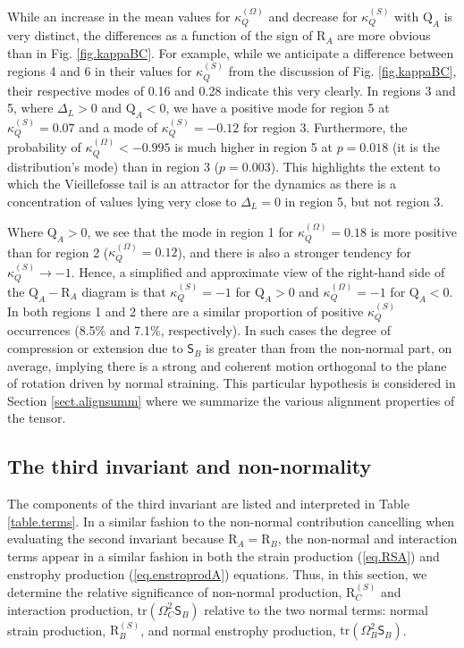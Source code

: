 \documentclass[preprint,amssymb,amsmath,aip,cha]{revtex4-1}
\begin{document}
While an increase in the mean values for $\kappa_{Q}^{(\Omega)}$ and decrease for $\kappa_{Q}^{(S)}$ with $\mbox{Q}_{A}$ is very distinct, the differences as a function of the sign of $\mbox{R}_{A}$ are more obvious than in Fig. \ref{fig.kappaBC}. For example, while we anticipate a difference between regions 4 and 6 in their values for $\kappa_{Q}^{(S)}$ from the discussion of Fig. \ref{fig.kappaBC}, their respective modes of 0.16 and 0.28 indicate this very clearly. In regions 3 and 5, where $\Delta_{L} > 0$ and $\mbox{Q}_{A} < 0$, we have a positive mode for region 5 at $\kappa_{Q}^{(S)} = 0.07$ and a mode of $\kappa_{Q}^{(S)} = -0.12$ for region 3. Furthermore, the probability of $\kappa_{Q}^{(\Omega)} < -0.995$ is much higher in region 5 at $p = 0.018$ (it is the distribution's mode) than in region 3 ($p = 0.003$). This highlights the extent to which the Vieillefosse tail is an attractor for the dynamics as there is a concentration of values lying very close to $\Delta_{L} = 0$ in region 5, but not region 3.

Where $\mbox{Q}_{A} > 0$, we see that the mode in region 1 for $\kappa_{Q}^{(\Omega)} = 0.18$ is more positive than for region 2 ($\kappa_{Q}^{(\Omega)} = 0.12$), and there is also a stronger tendency for $\kappa_{Q}^{(S)} \to -1$. Hence, a simplified and approximate view of the right-hand side of the $\mbox{Q}_{A}-\mbox{R}_{A}$ diagram is that $\kappa_{Q}^{(S)} = -1$ for $\mbox{Q}_{A} > 0$ and $\kappa_{Q}^{(\Omega)} = -1$ for $\mbox{Q}_{A} < 0$. In both regions 1 and 2 there are a similar proportion of positive $\kappa_{Q}^{(S)}$ occurrences (8.5\% and 7.1\%, respectively). In such cases the degree of compression or extension due to $\mathsf{S}_{B}$ is greater than from the non-normal part, on average, implying there is a strong and coherent motion orthogonal to the plane of rotation driven by normal straining. This particular hypothesis is considered in Section \ref{sect.alignsumm} where we summarize the various alignment properties of the tensor. 

\subsection{The third invariant and non-normality}
\label{sect.inv3}
The components of the third invariant are listed and interpreted in Table \ref{table.terms}. In a similar fashion to the non-normal contribution cancelling when evaluating the second invariant because $\mbox{R}_{A} = \mbox{R}_{B}$, the non-normal and interaction terms appear in a similar fashion in both the strain production (\ref{eq.RSA}) and enstrophy production (\ref{eq.enstroprodA}) equations. Thus, in this section, we determine the relative significance of non-normal production, $\mbox{R}_{C}^{(S)}$ and interaction production, $\mbox{tr}(\mathsf{\Omega}_{C}^{2}\mathsf{S}_{B})$ relative to the two normal terms: normal strain production, $\mbox{R}_{B}^{(S)}$, and normal enstrophy production, $\mbox{tr}(\mathsf{\Omega}_{B}^{2}\mathsf{S}_{B})$. 
\end{document}
